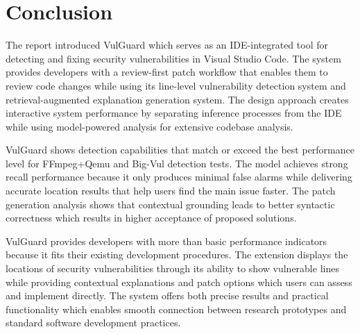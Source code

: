 \section{Conclusion}
The report introduced VulGuard which serves as an IDE-integrated tool for detecting and fixing security vulnerabilities in Visual Studio Code. The system provides developers with a review-first patch workflow that enables them to review code changes while using its line-level vulnerability detection system and retrieval-augmented explanation generation system. The design approach creates interactive system performance by separating inference processes from the IDE while using model-powered analysis for extensive codebase analysis.

VulGuard shows detection capabilities that match or exceed the best performance level for FFmpeg+Qemu and Big-Vul detection tests. The model achieves strong recall performance because it only produces minimal false alarms while delivering accurate location results that help users find the main issue faster. The patch generation analysis shows that contextual grounding leads to better syntactic correctness which results in higher acceptance of proposed solutions.

VulGuard provides developers with more than basic performance indicators because it fits their existing development procedures. The extension displays the locations of security vulnerabilities through its ability to show vulnerable lines while providing contextual explanations and patch options which users can assess and implement directly. The system offers both precise results and practical functionality which enables smooth connection between research prototypes and standard software development practices.

